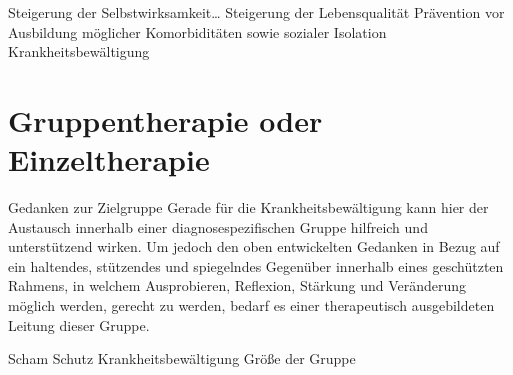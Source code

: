 
Steigerung der Selbstwirksamkeit…
Steigerung der Lebensqualität
Prävention vor Ausbildung möglicher Komorbiditäten sowie sozialer Isolation
Krankheitsbewältigung

\section{Gruppentherapie oder Einzeltherapie}
Gedanken zur Zielgruppe
Gerade für die Krankheitsbewältigung kann hier der Austausch innerhalb einer diagnosespezifischen Gruppe hilfreich und unterstützend wirken. Um jedoch den oben entwickelten Gedanken in Bezug auf ein haltendes, stützendes und spiegelndes Gegenüber innerhalb eines geschützten Rahmens, in welchem Ausprobieren, Reflexion, Stärkung und Veränderung möglich werden, gerecht zu werden, bedarf es einer therapeutisch ausgebildeten Leitung dieser Gruppe. 

Scham
Schutz
Krankheitsbewältigung
Größe der Gruppe

